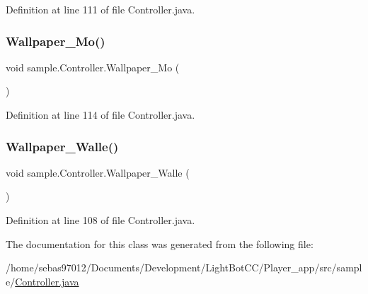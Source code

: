 Definition at line 111 of file Controller.\+java.

\mbox{\label{classsample_1_1_controller_aea439b1c1f82fafed2d06f7bb70e00ec}} 
\subsubsection{\texorpdfstring{Wallpaper\+\_\+\+Mo()}{Wallpaper\_Mo()}}
{\footnotesize\ttfamily void sample.\+Controller.\+Wallpaper\+\_\+\+Mo (\begin{DoxyParamCaption}{ }\end{DoxyParamCaption})\hspace{0.3cm}{\ttfamily [inline]}}



Definition at line 114 of file Controller.\+java.

\mbox{\label{classsample_1_1_controller_a75b0e78fcaff17ed082954c1459e9ab9}} 
\subsubsection{\texorpdfstring{Wallpaper\+\_\+\+Walle()}{Wallpaper\_Walle()}}
{\footnotesize\ttfamily void sample.\+Controller.\+Wallpaper\+\_\+\+Walle (\begin{DoxyParamCaption}{ }\end{DoxyParamCaption})\hspace{0.3cm}{\ttfamily [inline]}}



Definition at line 108 of file Controller.\+java.



The documentation for this class was generated from the following file\+:\begin{DoxyCompactItemize}
\item 
/home/sebas97012/\+Documents/\+Development/\+Light\+Bot\+C\+C/\+Player\+\_\+app/src/sample/\mbox{\hyperlink{_controller_8java}{Controller.\+java}}\end{DoxyCompactItemize}
